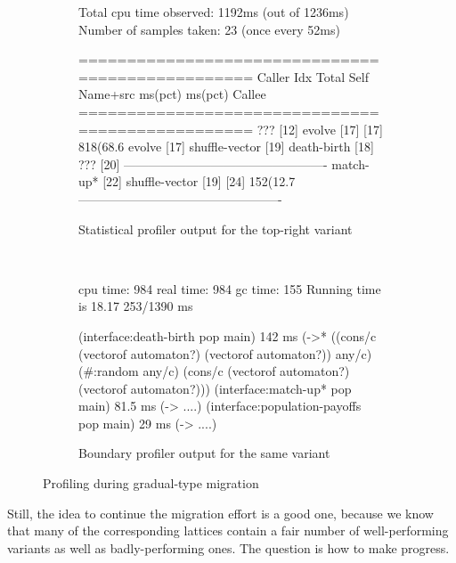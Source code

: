 \begin{figure}[htb]
\begin{subfigure}[t]{0.53\columnwidth}
    \footnotesize
    \begin{boxedverbatim}
  Total cpu time observed: 1192ms (out of 1236ms)
  Number of samples taken: 23 (once every 52ms)

=================================================
                              Caller
 Idx   Total       Self      Name+src
       ms(pct)     ms(pct)    Callee
=================================================
                              ??? [12]
                              evolve [17]
[17]  818(68.6%
                              evolve [17]
                              shuffle-vector [19]
                              death-birth [18]
                              ??? [20]
-------------------------------------------------
                              match-up* [22]
                              shuffle-vector [19]
[24]  152(12.7%
-------------------------------------------------
    \end{boxedverbatim}
    \caption{Statistical profiler output for the top-right variant} \label{f:fsm-code:statistical}
  \end{subfigure}~\begin{subfigure}[t]{0.44\columnwidth}
    \footnotesize
    \begin{boxedverbatim}
cpu time: 984 real time: 984 gc time: 155
Running time is 18.17%
253/1390 ms

(interface:death-birth pop main)
  142 ms
  (->* ((cons/c (vectorof automaton?)
                (vectorof automaton?))
        any/c)
       (#:random any/c)
       (cons/c (vectorof automaton?)
               (vectorof automaton?)))
(interface:match-up* pop main)
  81.5 ms
  (-> ....)
(interface:population-payoffs pop main)
  29 ms
  (-> ....)


    \end{boxedverbatim}
    \caption{Boundary profiler output for the same variant} \label{f:fsm-code:boundary}
  \end{subfigure}

  \caption{Profiling during gradual-type migration} \label{f:fsm-code}
\end{figure}

Still, the idea to continue the migration effort is a good one, because we know
that many of the corresponding lattices contain a fair number of well-performing
variants as well as badly-performing ones. The question is how to make progress.

